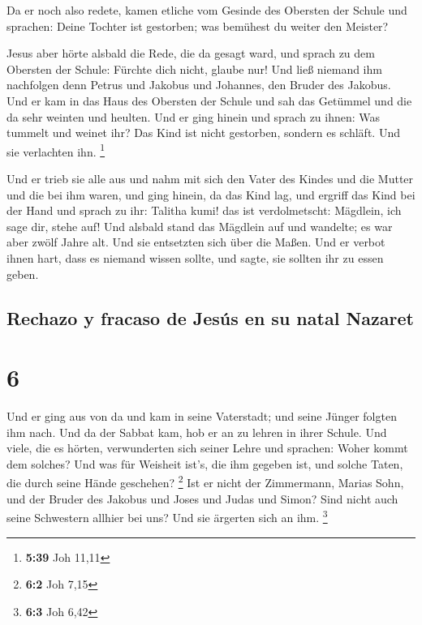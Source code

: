  Da er noch also redete, kamen etliche vom Gesinde des
Obersten der Schule und sprachen: Deine Tochter ist gestorben; was
bemühest du weiter den Meister?

 Jesus aber hörte alsbald die Rede, die da gesagt ward,
und sprach zu dem Obersten der Schule: Fürchte dich nicht, glaube nur!
 Und ließ niemand ihm nachfolgen denn Petrus und Jakobus
und Johannes, den Bruder des Jakobus.  Und er kam in das
Haus des Obersten der Schule und sah das Getümmel und die da sehr
weinten und heulten.  Und er ging hinein und sprach zu
ihnen: Was tummelt und weinet ihr? Das Kind ist nicht gestorben, sondern
es schläft. Und sie verlachten ihn. \footnote{\textbf{5:39} Joh 11,11}

 Und er trieb sie alle aus und nahm mit sich den Vater
des Kindes und die Mutter und die bei ihm waren, und ging hinein, da das
Kind lag,  und ergriff das Kind bei der Hand und sprach
zu ihr: Talitha kumi! das ist verdolmetscht: Mägdlein, ich sage dir,
stehe auf!  Und alsbald stand das Mägdlein auf und
wandelte; es war aber zwölf Jahre alt. Und sie entsetzten sich über die
Maßen.  Und er verbot ihnen hart, dass es niemand wissen
sollte, und sagte, sie sollten ihr zu essen geben.

\hypertarget{rechazo-y-fracaso-de-jesuxfas-en-su-natal-nazaret}{%
\subsection{Rechazo y fracaso de Jesús en su natal
Nazaret}\label{rechazo-y-fracaso-de-jesuxfas-en-su-natal-nazaret}}

\hypertarget{section-5}{%
\section{6}\label{section-5}}

 Und er ging aus von da und kam in seine Vaterstadt; und
seine Jünger folgten ihm nach.  Und da der Sabbat kam, hob
er an zu lehren in ihrer Schule. Und viele, die es hörten, verwunderten
sich seiner Lehre und sprachen: Woher kommt dem solches? Und was für
Weisheit ist's, die ihm gegeben ist, und solche Taten, die durch seine
Hände geschehen? \footnote{\textbf{6:2} Joh 7,15}  Ist er
nicht der Zimmermann, Marias Sohn, und der Bruder des Jakobus und Joses
und Judas und Simon? Sind nicht auch seine Schwestern allhier bei uns?
Und sie ärgerten sich an ihm. \footnote{\textbf{6:3} Joh 6,42}

